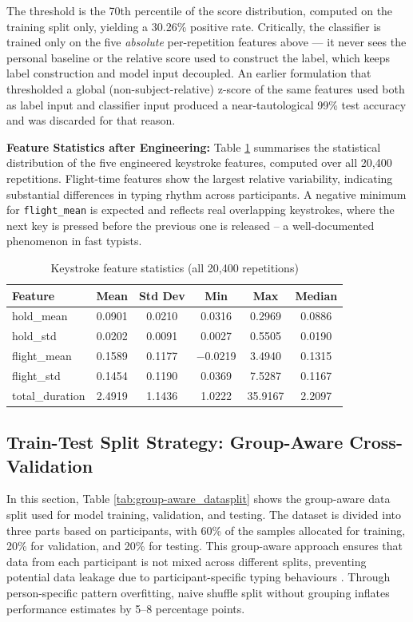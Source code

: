 \documentclass[fleqn,10pt]{wlscirep}
\begin{document}
The threshold is the 70th percentile of the score distribution, computed on the training split only, yielding a 30.26\% positive rate. Critically, the classifier is trained only on the five \textit{absolute} per-repetition features above --- it never sees the personal baseline or the relative score used to construct the label, which keeps label construction and model input decoupled. An earlier formulation that thresholded a global (non-subject-relative) z-score of the same features used both as label input and classifier input produced a near-tautological 99\% test accuracy and was discarded for that reason.

\textbf{Feature Statistics after Engineering:}
Table \ref{tab:keystroke_features} summarises the statistical distribution of the five engineered keystroke features, computed over all 20,400 repetitions. Flight-time features show the largest relative variability, indicating substantial differences in typing rhythm across participants. A negative minimum for \texttt{flight\_mean} is expected and reflects real overlapping keystrokes, where the next key is pressed before the previous one is released -- a well-documented phenomenon in fast typists.

\begin{table}[htbp]
\centering
\caption{Keystroke feature statistics (all 20,400 repetitions)}
\label{tab:keystroke_features}
\begin{tabular}{lccccc}
\toprule
Feature & Mean & Std Dev & Min & Max & Median \\
\midrule
hold\_mean & 0.0901 & 0.0210 & 0.0316 & 0.2969 & 0.0886 \\
hold\_std & 0.0202 & 0.0091 & 0.0027 & 0.5505 & 0.0190 \\
flight\_mean & 0.1589 & 0.1177 & $-$0.0219 & 3.4940 & 0.1315 \\
flight\_std & 0.1454 & 0.1190 & 0.0369 & 7.5287 & 0.1167 \\
total\_duration & 2.4919 & 1.1436 & 1.0222 & 35.9167 & 2.2097 \\
\bottomrule
\end{tabular}
\end{table}

\subsection*{Train-Test Split Strategy: Group-Aware Cross-Validation}
In this section, Table \ref{tab:group-aware_datasplit} shows the group-aware data split used for model training, validation, and testing. The dataset is divided into three parts based on participants, with 60\% of the samples allocated for training, 20\% for validation, and 20\% for testing. This group-aware approach ensures that data from each participant is not mixed across different splits, preventing potential data leakage due to participant-specific typing behaviours \cite{27priego2025multimodal}. Through person-specific pattern overfitting, naive shuffle split without grouping inflates performance estimates by 5--8 percentage points.
\end{document}
